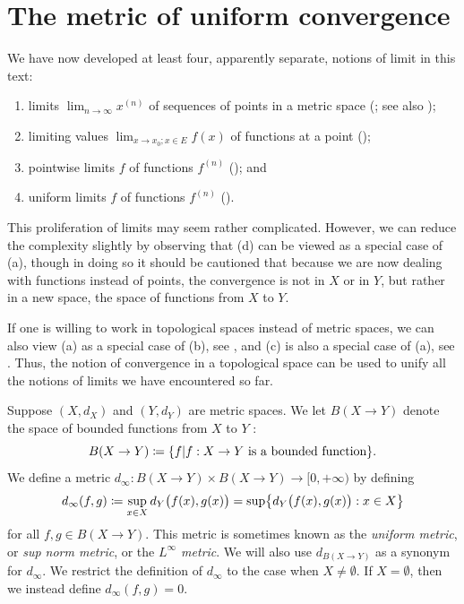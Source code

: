 \section{The metric of uniform convergence}\label{ii:sec:3.4}

\begin{note}
  We have now developed at least four, apparently separate, notions of limit in this text:
  \begin{enumerate}
    \item limits \(\lim_{n \to \infty} x^{(n)}\) of sequences of points in a metric space
          (;
          see also );
    \item limiting values \(\lim_{x \to x_0 ; x \in E} f(x)\) of functions at a point
          ();
    \item pointwise limits \(f\) of functions \(f^{(n)}\)
          ();
          and
    \item uniform limits \(f\) of functions \(f^{(n)}\)
          ().
  \end{enumerate}

  This proliferation of limits may seem rather complicated.
  However, we can reduce the complexity slightly by observing that (d) can be viewed as a special case of (a), though in doing so it should be cautioned that because we are now dealing with functions instead of points, the convergence is not in \(X\) or in \(Y\), but rather in a new space, the space of functions from \(X\) to \(Y\).
\end{note}

\begin{rmk}\label{ii:3.4.1}
  If one is willing to work in topological spaces instead of metric spaces, we can also view (a) as a special case of (b), see , and (c) is also a special case of (a), see .
  Thus, the notion of convergence in a topological space can be used to unify all the notions of limits we have encountered so far.
\end{rmk}

\begin{defn}\label{ii:3.4.2}
  Suppose \((X, d_X)\) and \((Y, d_Y)\) are metric spaces.
  We let \(B(X \to Y)\) denote the space of bounded functions from \(X\) to \(Y\) :
  \[
    B(X \to Y) \coloneqq \set{f | f : X \to Y \text{ is a bounded function}}.
  \]
  We define a metric \(d_\infty : B(X \to Y) \times B(X \to Y) \to [0, +\infty)\) by defining
  \[
    d_\infty(f, g) \coloneqq \sup_{x \in X} d_Y\big(f(x), g(x)\big) = \sup\set{d_Y\big(f(x), g(x)\big) : x \in X}
  \]
  for all \(f, g \in B(X \to Y)\).
  This metric is sometimes known as the \emph{uniform metric}, or \emph{sup norm metric}, or the \emph{\(L^\infty\) metric}.
  We will also use \(d_{B(X \to Y)}\) as a synonym for \(d_\infty\).
  We restrict the definition of \(d_\infty\) to the case when \(X \neq \emptyset\).
  If \(X = \emptyset\), then we instead define \(d_\infty(f, g) = 0\).
\end{defn}

